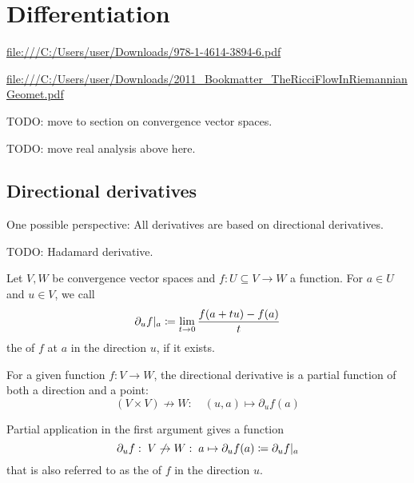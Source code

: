 \chapter{Differentiation}
\url{file:///C:/Users/user/Downloads/978-1-4614-3894-6.pdf}

\url{file:///C:/Users/user/Downloads/2011_Bookmatter_TheRicciFlowInRiemannianGeomet.pdf}

TODO: move to section on convergence vector spaces.

TODO: move real analysis above here.


\section{Directional derivatives}
One possible perspective: All derivatives are based on directional derivatives.

TODO: Hadamard derivative.

\begin{definition}
Let $V,W$ be convergence vector spaces and $f:U\subseteq V\to W$ a function. For $a\in U$ and $u\in V$, we call
\[ \partial_u f|_a \coloneqq \lim_{t\to 0} \frac{f(a+tu) - f(a)}{t} \]
the  of $f$ at $a$ in the direction $u$, if it exists.
\end{definition}

For a given function $f:V\to W$, the directional derivative is a partial function of both a direction and a point:
\[ (V\times V) \not\to W:\quad (u,a) \mapsto \partial_u f(a)  \]

Partial application in the first argument gives a function
\[ \partial_u f:\; V\not\to W:\; a\mapsto \partial_u f(a) \coloneqq \partial_u f|_a \]
that is also referred to as the  of $f$ in the direction $u$.



